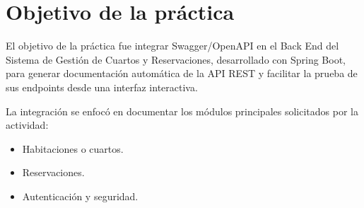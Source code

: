 \documentclass[10pt,a4paper]{article}
\begin{document}
\begin{titlepage}
    \centering
    {\huge\bfseries\color{colorIPN}{Instituto Politécnico Nacional}\par}
    {\Large\bfseries\color{colorESCOM}{Escuela Superior de Cómputo}\par}
    \vspace{1cm}
    {\Large\color{colorIPN}{Desarrollo de Aplicaciones Web Client and Backend Development Frameworks}\par}
    \vspace{1.5cm}
    {\huge\bfseries\color{colorESCOM}{Integración de Swagger/OpenAPI}\par}
    \vspace{0.4cm}
    {\Large\bfseries\color{colorIPN}{Sistema de Gestión de Cuartos y Reservaciones}\par}
    \vspace{2cm}
    {\Large\itshape\color{colorIPN}{Profesor: M. en C. José Asunción Enríquez Zárate}\par}
    \vspace{1.5cm}
    {\Large\itshape\color{colorIPN}{Alumna: Estefany Karina Sánchez Calderón}\par}
    {\Large\itshape\color{colorIPN}{estefanysanchez1495@gmail.com}\par}
    {\Large\itshape\color{colorIPN}{Grupo: 7CM3}\par}
    \vfill
    {\large\color{colorIPN}{\today}\par}
\end{titlepage}

\tableofcontents
\pagebreak

\section{Objetivo de la práctica}

El objetivo de la práctica fue integrar Swagger/OpenAPI en el Back End del Sistema de Gestión de Cuartos y Reservaciones, desarrollado con Spring Boot, para generar documentación automática de la API REST y facilitar la prueba de sus endpoints desde una interfaz interactiva.

La integración se enfocó en documentar los módulos principales solicitados por la actividad:

\begin{itemize}
    \item Habitaciones o cuartos.
    \item Reservaciones.
    \item Autenticación y seguridad.
\end{itemize}
\end{document}
